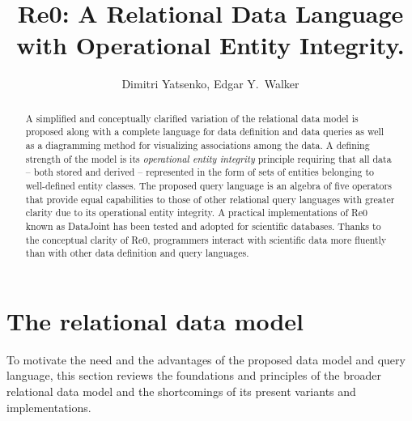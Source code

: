 \documentclass[letter,twocolumn,11pt]{article}
\title{Re0: A Relational Data Language with Operational Entity Integrity.}
\author{Dimitri Yatsenko, Edgar Y.\ Walker}
\begin{document}
\maketitle
\begin{abstract}
A simplified and conceptually clarified variation of the relational data model is proposed along with a complete language for data definition and data queries as well as a diagramming method for visualizing associations among the data.  
A defining strength of the model is its \emph{operational entity integrity} principle requiring that all data -- both stored and derived -- represented in the form of sets of entities belonging to well-defined entity classes.  
The proposed query language is an algebra of five operators that provide equal capabilities to those of other relational query languages with greater clarity due to its operational entity integrity. 
A practical implementations of Re0 known as DataJoint has been tested and adopted for scientific databases.  
Thanks to the conceptual clarity of Re0, programmers interact with scientific data more fluently than with other data definition and query languages.

\end{abstract}

\section{The relational data model}
To motivate the need and the advantages of the proposed data model and query language, this section reviews the foundations and principles of the broader relational data model and the shortcomings of its present variants and implementations. 
\end{document}

